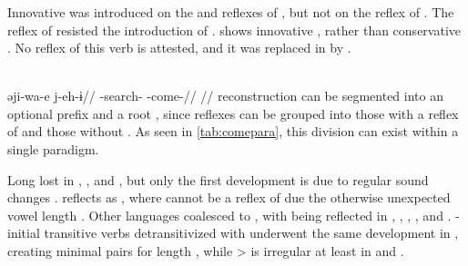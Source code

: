 \subsubsection{ }
\label{sec:come}
Innovative  was introduced on the \ikpeng and \bakairi reflexes of , but not on the \arara reflex of  .
The reflex of  resisted the introduction of \PTir {} .
\carijo {} shows innovative , rather than conservative  .
No \yukpa reflex of this verb is attested, and it was replaced in \PWai by  .

\carijo \parencite[][102]{guerrero2019carijo}\\
\begingl
\gla əji-wa-e j-eh-ɨ//
\glb {}-search- -come-//
\glft {}//
\endgl
\xe
%
 reconstruction  can be segmented into an optional prefix  and a root , since reflexes can be grouped into those with a reflex of  and those without .
As seen in \cref{tab:comepara}, this division can exist within a single paradigm.





Long  lost  in \trio, \apalai, and \bakairi, but only the first development is due to regular sound changes \parencite[31--32]{meira1998proto}.
\akuriyo reflects  as , where  cannot be a reflex of  due the otherwise unexpected vowel length \parencite[114--115]{meira1998proto}.
Other languages coalesced  to , with  being reflected in \uxc \parencite[452]{gildea2012classification}, \kalina, \kaxui, \panare, and \yawarana.
-initial transitive verbs detransitivized with  underwent the same development in \kalina, creating minimal pairs for length \parencite[509--510]{meira2010origin}, while  >  is irregular at least in \kaxui and \panare.



